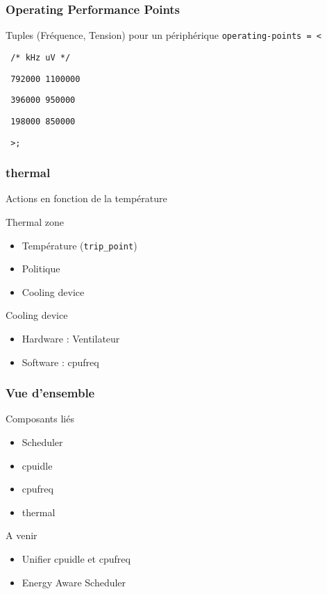 \begin{frame}
	\frametitle{Operating Performance Points}
	\begin{block}{Tuples (Fréquence, Tension) pour un périphérique}
	\texttt{operating-points = <}

	\texttt{     /* kHz    uV */}

	\texttt{     792000  1100000}

	\texttt{     396000  950000}

	\texttt{     198000  850000}

	\texttt{     >;}
	\end{block}
\end{frame}
\begin{frame}
	\frametitle{thermal}
	Actions en fonction de la température
	\begin{block}{Thermal zone}
		\begin{itemize}
			\item Température (\texttt{trip\_point})
			\item Politique 
			\item Cooling device
		\end{itemize}
	\end{block}
	\begin{block}{Cooling device}
		\begin{itemize}
			\item Hardware : Ventilateur
			\item Software : cpufreq
		\end{itemize}
	\end{block}
\end{frame}

\begin{frame}
	\frametitle{Vue d'ensemble}
	\begin{block}{Composants liés}
		\begin{itemize}
			\item Scheduler
			\item cpuidle
			\item cpufreq
			\item thermal
		\end{itemize}
	\end{block}
	\begin{block}{A venir}
		\begin{itemize}
			\item Unifier cpuidle et cpufreq
			\item Energy Aware Scheduler
		\end{itemize}
	\end{block}
\end{frame}
